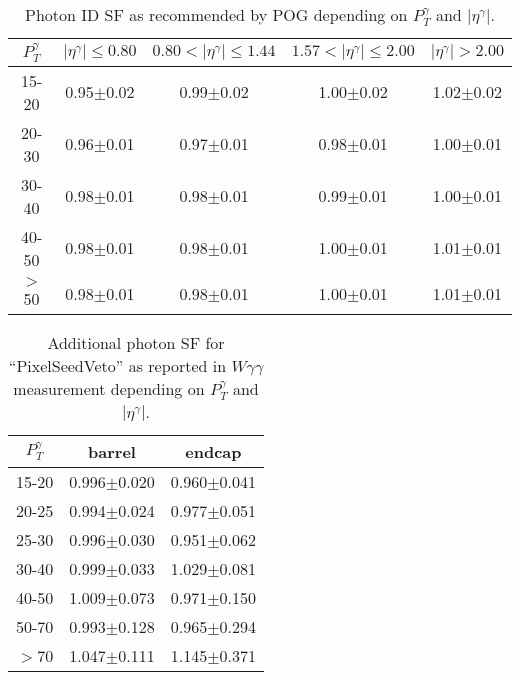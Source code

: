\begin{table}[h]
  \footnotesize
  \begin{center}
  \caption{Photon ID SF as recommended by POG depending on $P_T^{\gamma}$ and $|\eta^{\gamma}|$.} 
   \begin{tabular}{|c|c|c|c|c|}
 $P_T^{\gamma}$  & $|\eta^{\gamma}|\leq 0.80$ & $0.80<|\eta^{\gamma}|\leq 1.44$ & $1.57<|\eta^{\gamma}|\leq 2.00$ & $|\eta^{\gamma}|> 2.00$\\ \hline
15-20          & 0.95$\pm$0.02   & 0.99$\pm$0.02        & 1.00$\pm$0.02        & 1.02$\pm$0.02 \\ \hline
20-30          & 0.96$\pm$0.01   & 0.97$\pm$0.01        & 0.98$\pm$0.01        & 1.00$\pm$0.01 \\ \hline
30-40          & 0.98$\pm$0.01   & 0.98$\pm$0.01        & 0.99$\pm$0.01        & 1.00$\pm$0.01 \\ \hline
40-50          & 0.98$\pm$0.01   & 0.98$\pm$0.01        & 1.00$\pm$0.01        & 1.01$\pm$0.01 \\ \hline
$>$50          & 0.98$\pm$0.01   & 0.98$\pm$0.01        & 1.00$\pm$0.01        & 1.01$\pm$0.01 \\ \hline
  \end{tabular}
  \label{tab:SFs_PhotonID}
  \end{center}
\end{table}

\begin{table}[h]
  \footnotesize
  \begin{center}
  \caption{Additional photon SF for ``PixelSeedVeto'' as reported in $W\gamma\gamma$ measurement depending on $P_T^{\gamma}$ and $|\eta^{\gamma}|$.} 
   \begin{tabular}{|c|c|c|}
 $P_T^{\gamma}$  & barrel              & endcap \\ \hline
15-20          & 0.996$\pm$0.020     & 0.960$\pm$0.041 \\ \hline
20-25          & 0.994$\pm$0.024     & 0.977$\pm$0.051 \\ \hline
25-30          & 0.996$\pm$0.030     & 0.951$\pm$0.062 \\ \hline
30-40          & 0.999$\pm$0.033     & 1.029$\pm$0.081 \\ \hline
40-50          & 1.009$\pm$0.073     & 0.971$\pm$0.150 \\ \hline
50-70          & 0.993$\pm$0.128     & 0.965$\pm$0.294 \\ \hline
$>$70          & 1.047$\pm$0.111     & 1.145$\pm$0.371 \\ \hline

  \end{tabular}
  \label{tab:SFs_PhotonPixelSeedVeto}
  \end{center}
\end{table}
